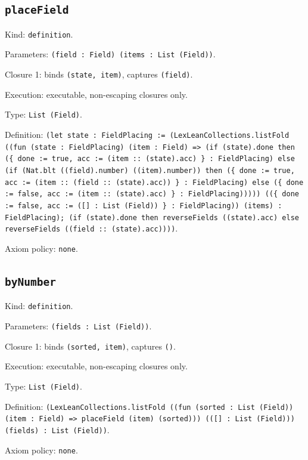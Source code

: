\documentclass[11pt]{article}
\begin{document}
\subsection*{\texttt{placeField}}
\noindent Kind: \texttt{definition}.\par
\noindent Parameters: \texttt{(field : Field) (items : List (Field))}.\par
\noindent Closure 1: binds \texttt{(state, item)}, captures \texttt{(field)}.\par
\noindent Execution: executable, non-escaping closures only.\par
\noindent Type: \texttt{List (Field)}.\par
\noindent Definition: \texttt{(let state : FieldPlacing := (LexLeanCollections.listFold ((fun (state : FieldPlacing) (item : Field) => (if (state).done then (\{ done := true, acc := (item :: (state).acc) \} : FieldPlacing) else (if (Nat.blt ((field).number) ((item).number)) then (\{ done := true, acc := (item :: (field :: (state).acc)) \} : FieldPlacing) else (\{ done := false, acc := (item :: (state).acc) \} : FieldPlacing))))) ((\{ done := false, acc := ([] : List (Field)) \} : FieldPlacing)) (items) : FieldPlacing); (if (state).done then reverseFields ((state).acc) else reverseFields ((field :: (state).acc))))}.\par
\noindent Axiom policy: \texttt{none}.\par
\subsection*{\texttt{byNumber}}
\noindent Kind: \texttt{definition}.\par
\noindent Parameters: \texttt{(fields : List (Field))}.\par
\noindent Closure 1: binds \texttt{(sorted, item)}, captures \texttt{()}.\par
\noindent Execution: executable, non-escaping closures only.\par
\noindent Type: \texttt{List (Field)}.\par
\noindent Definition: \texttt{(LexLeanCollections.listFold ((fun (sorted : List (Field)) (item : Field) => placeField (item) (sorted))) (([] : List (Field))) (fields) : List (Field))}.\par
\noindent Axiom policy: \texttt{none}.\par
\end{document}
